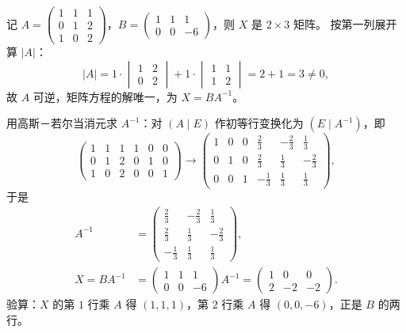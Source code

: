 \begin{solution}
记 $A=\begin{pmatrix}1&1&1\\0&1&2\\1&0&2\end{pmatrix}$，$B=\begin{pmatrix}1&1&1\\0&0&-6\end{pmatrix}$，则 $X$ 是 $2\times3$ 矩阵。
按第一列展开算 $|A|$：
\[
|A|=1\cdot\begin{vmatrix}1&2\\0&2\end{vmatrix}+1\cdot\begin{vmatrix}1&1\\1&2\end{vmatrix}=2+1=3\ne0,
\]
故 $A$ 可逆，矩阵方程的解唯一，为 $X=BA^{-1}$。

用高斯－若尔当消元求 $A^{-1}$：对 $(A\mid E)$ 作初等行变换化为 $(E\mid A^{-1})$，即
\[
\left(\begin{array}{ccc|ccc}
1&1&1&1&0&0\\
0&1&2&0&1&0\\
1&0&2&0&0&1
\end{array}\right)
\longrightarrow
\left(\begin{array}{ccc|ccc}
1&0&0&\frac23&-\frac23&\frac13\\[1mm]
0&1&0&\frac23&\frac13&-\frac23\\[1mm]
0&0&1&-\frac13&\frac13&\frac13
\end{array}\right),
\]
于是
\begin{align*}
A^{-1}&=\begin{pmatrix}\frac23&-\frac23&\frac13\\[1mm]\frac23&\frac13&-\frac23\\[1mm]-\frac13&\frac13&\frac13\end{pmatrix},\\
X=BA^{-1}&=\begin{pmatrix}1&1&1\\0&0&-6\end{pmatrix}A^{-1}
=\begin{pmatrix}1&0&0\\2&-2&-2\end{pmatrix}.
\end{align*}
验算：$X$ 的第 $1$ 行乘 $A$ 得 $(1,1,1)$，第 $2$ 行乘 $A$ 得 $(0,0,-6)$，正是 $B$ 的两行。
\end{solution}

